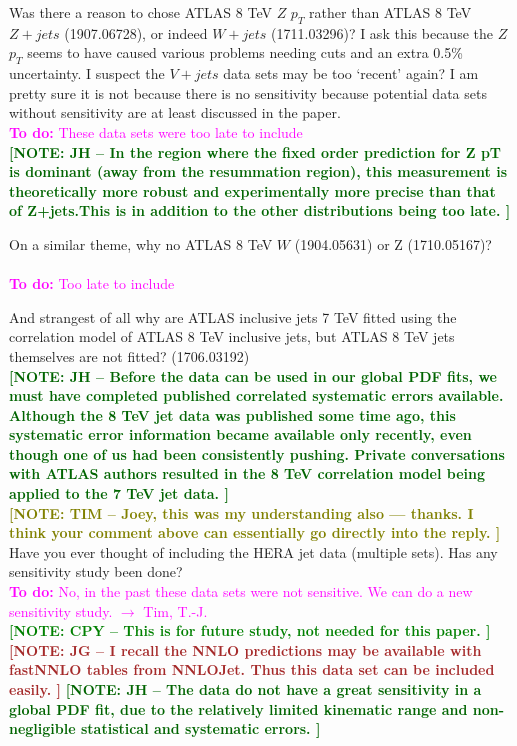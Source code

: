 \documentclass[aps,prd,amsmath,nofootinbib,floatfix,fleqn]{revtex4}
\newcommand{\TODO}[1]{\textcolor{magenta}{
\quad\vspace{3pt} \\ {\bf To do:} #1 \\
}}
\newcommand{\NOTECPY}[1]{\textcolor{green}{ \bf[NOTE: CPY -- #1 ]}}
\newcommand{\NOTEJH}[1]{\textcolor{darkgreen}{ \bf[NOTE: JH -- #1 ]}}
\newcommand{\NOTETIM}[1]{\textcolor{olive}{ \bf[NOTE: TIM -- #1 ]}}
\newcommand{\NOTEJG}[1]{\textcolor{brown}{ \bf[NOTE: JG -- #1 ]}}
\begin{document}
\noindent
Was there a reason to chose ATLAS 8 TeV $Z$ $p_T$  rather than ATLAS 8 TeV $Z+jets$ (1907.06728), or
indeed $W+jets$ (1711.03296)? I ask this because the $Z$ $p_T$ seems to have caused various problems needing cuts and an extra 0.5\% uncertainty. I suspect the $V+jets$ data sets may be too ‘recent’ again? I am pretty sure it is not because there is no sensitivity because potential data sets without sensitivity are at least discussed in the paper. 
\TODO{These data sets were too late to include}
\NOTEJH{In the region where the fixed order prediction for Z pT is dominant (away from the resummation region), this measurement is theoretically more robust and experimentally more precise than that of Z+jets.This is in addition to the other distributions being too late.}

\noindent 
On a similar theme, why no ATLAS 8 TeV $W$ (1904.05631) or Z (1710.05167)? \\
\TODO{Too late to include}

\noindent 
And strangest of all why are ATLAS inclusive jets 7 TeV fitted using the correlation model of ATLAS 8 TeV inclusive jets, but ATLAS 8 TeV jets themselves are not fitted? (1706.03192)  \\
\NOTEJH{Before the data can be used in our global PDF fits, we must have completed published correlated systematic errors available. Although the 8 TeV jet data was published some time ago, this systematic error information became available only recently,  even though one of us had been consistently pushing. Private conversations with ATLAS authors resulted in the 8 TeV correlation model being applied to the 7 TeV jet data.}\\
\NOTETIM{Joey, this was my understanding also --- thanks.  I think your comment above
can essentially go directly into the reply.}\\


\noindent 
Have you ever thought of including the HERA jet data (multiple sets). Has any sensitivity study been done? 
\TODO{No, in the past these data sets were not sensitive. We can do a new sensitivity study. $\to$ Tim, T.-J.}
\NOTECPY{This is for future study, not needed for this paper.}\\
\NOTEJG{I recall the NNLO predictions may be available with fastNNLO tables from NNLOJet. Thus this data set can be included easily.}
\NOTEJH{The data do not have a great sensitivity in a global PDF fit, due to the relatively limited kinematic range and non-negligible statistical and systematic errors.}
\end{document}
